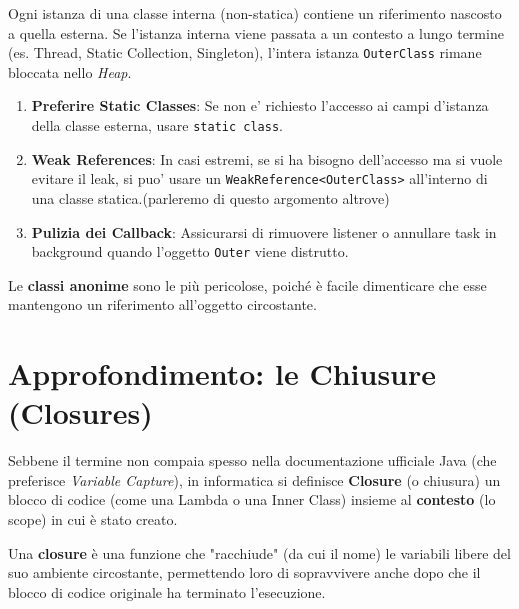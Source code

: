\begin{danger}
Ogni istanza di una classe interna (non-statica) contiene un riferimento nascosto a quella esterna. 
Se l'istanza interna viene passata a un contesto a lungo termine (es. Thread, Static Collection, Singleton), l'intera istanza \texttt{OuterClass} rimane bloccata nello \textit{Heap}.
\end{danger}

\begin{tip}
    \begin{enumerate}
        \item \textbf{Preferire Static Classes}: Se non e' richiesto l'accesso ai campi d'istanza della classe esterna, usare \texttt{static class}.
        \item \textbf{Weak References}: In casi estremi, se si ha bisogno dell'accesso ma si vuole evitare il leak, si puo' usare un \texttt{WeakReference<OuterClass>} all'interno di una classe statica.(parleremo di questo argomento altrove)
        \item \textbf{Pulizia dei Callback}: Assicurarsi di rimuovere listener o annullare task in background quando l'oggetto \texttt{Outer} viene distrutto.
    \end{enumerate}
\end{tip}

\begin{warningbox}
Le \textbf{classi anonime} sono le più pericolose, poiché è facile dimenticare che esse mantengono un riferimento all'oggetto circostante.
\end{warningbox}

\section{Approfondimento: le Chiusure (Closures)}

Sebbene il termine non compaia spesso nella documentazione ufficiale Java (che preferisce \textit{Variable Capture}), in informatica si definisce \textbf{Closure} (o chiusura) un blocco di codice (come una Lambda o una Inner Class) insieme al \textbf{contesto} (lo scope) in cui è stato creato.

\begin{tip}
Una \textbf{closure} è una funzione che "racchiude" (da cui il nome) le variabili libere del suo ambiente circostante, permettendo loro di sopravvivere anche dopo che il blocco di codice originale ha terminato l'esecuzione.
\end{tip}

